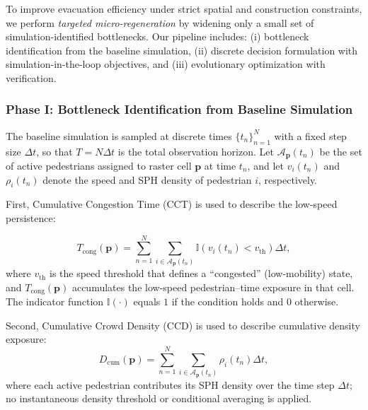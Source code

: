 \documentclass[preprint,12pt]{elsarticle}
\begin{document}
To improve evacuation efficiency under strict spatial and construction constraints, we perform
\emph{targeted micro-regeneration} by widening only a small set of simulation-identified bottlenecks.
Our pipeline includes: (i) bottleneck identification from the baseline simulation,
(ii) discrete decision formulation with simulation-in-the-loop objectives,
and (iii) evolutionary optimization with verification.

\subsubsection{Phase I: Bottleneck Identification from Baseline Simulation}
\label{sec:method_bottleneck}


The baseline simulation is sampled at discrete times $\{t_n\}_{n=1}^{N}$ with a fixed step size $\Delta t$,
so that $T = N\Delta t$ is the total observation horizon.
Let $\mathcal{A}_{\mathbf{p}}(t_n)$ be the set of active pedestrians assigned to raster cell $\mathbf{p}$ at time $t_n$,
and let $v_i(t_n)$ and $\rho_i(t_n)$ denote the speed and SPH density of pedestrian $i$, respectively.

First, Cumulative Congestion Time (CCT) is used to describe the low-speed persistence:

\begin{equation}
T_{\mathrm{cong}}(\mathbf{p})
=\sum_{n=1}^{N}\sum_{i\in\mathcal{A}_{\mathbf{p}}(t_n)}
\mathbb{I}\!\left(v_i(t_n)<v_{\mathrm{th}}\right)\Delta t ,
\label{eq:tcong}
\end{equation}
where $v_{\mathrm{th}}$ is the speed threshold that defines a ``congested'' (low-mobility) state,
and $T_{\mathrm{cong}}(\mathbf{p})$ accumulates the low-speed pedestrian--time exposure in that cell.
The indicator function $\mathbb{I}(\cdot)$ equals $1$ if the condition holds and $0$ otherwise.

Second, Cumulative Crowd Density (CCD) is used to describe cumulative density exposure:
\begin{equation}
D_{\mathrm{cum}}(\mathbf{p})
=\sum_{n=1}^{N}\sum_{i\in\mathcal{A}_{\mathbf{p}}(t_n)}
\rho_i(t_n)\Delta t ,
\label{eq:rhocong}
\end{equation}
where each active pedestrian contributes its SPH density over the time step $\Delta t$;
no instantaneous density threshold or conditional averaging is applied.
\end{document}
